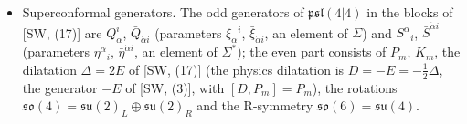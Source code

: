 \begin{remark}
\begin{itemize}
\item Superconformal generators. The odd generators of $\mathfrak{psl}(4|4)$ in the blocks of [SW, (17)] are $Q^i_\alpha$, $\bar Q_{\dot\alpha i}$ (parameters $\xi_\alpha{}^i$, $\bar\xi_{\dot\alpha i}$, an element of $\Sigma$) and $S^\alpha{}_i$, $\bar S^{\dot\alpha i}$ (parameters $\eta^\alpha{}_i$, $\bar\eta^{\dot\alpha i}$, an element of $\Sigma^*$); the even part consists of $P_m$, $K_m$, the dilatation $\Delta=2E$ of [SW, (17)] (the physics dilatation is $D=-E=-\tfrac12\Delta$, the generator $-E$ of [SW, (3)], with $[D,P_m]=P_m$), the rotations $\mathfrak{so}(4)=\mathfrak{su}(2)_L\oplus\mathfrak{su}(2)_R$ and the R-symmetry $\mathfrak{so}(6)=\mathfrak{su}(4)$.
\end{itemize}
\end{remark}
